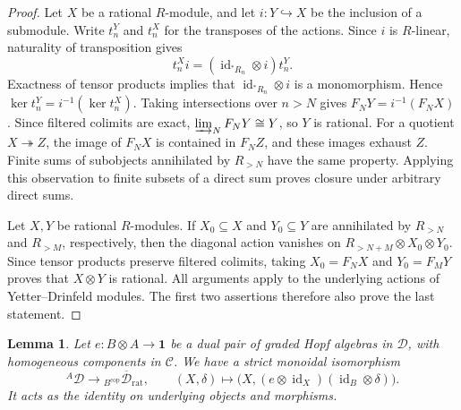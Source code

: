 \documentclass[11pt, a4paper]{article}
\numberwithin{equation}{section}
\newcommand{\C}{\mathcal C}
\newcommand{\D}{\mathcal D}
\newcommand{\one}{\mathbf 1}
\DeclareMathOperator{\id}{id}
\newcommand{\rat}{\mathrm{rat}}
\newtheorem{lemma}[theorem]{Lemma}
\begin{document}
\begin{proof}

Let $X$ be a rational $R$-module, and let
$i:Y\hookrightarrow X$ be the inclusion of a submodule.
Write $t_n^Y$ and $t_n^X$ for the transposes of the actions.
Since $i$ is $R$-linear, naturality of transposition gives
\[
 t_n^Xi=(\id_{{^*R_n}}\otimes i)t_n^Y.
\]
Exactness of tensor products implies that
$\id_{{^*R_n}}\otimes i$ is a monomorphism. Hence
$\ker t_n^Y=i^{-1}(\ker t_n^X)$.
Taking intersections over $n>N$ gives $F_NY=i^{-1}(F_NX)$.
Since filtered colimits are exact,
$\varinjlim_NF_NY\cong Y$, so $Y$ is rational.
For a quotient
$X\twoheadrightarrow Z$, the image of $F_NX$ is contained in $F_NZ$,
and these images exhaust $Z$. Finite sums of subobjects annihilated by
$R_{>N}$ have the same property. Applying this observation to finite
subsets of a direct sum proves closure under arbitrary direct sums.



Let $X,Y$ be rational $R$-modules. If $X_0\subseteq X$ and
$Y_0\subseteq Y$ are annihilated by $R_{>N}$ and $R_{>M}$,
respectively, then the diagonal action vanishes on
$R_{>N+M}\otimes X_0\otimes Y_0$.
Since tensor products preserve filtered colimits, taking
$X_0=F_NX$ and $Y_0=F_MY$ proves that $X\otimes Y$ is rational.
All arguments apply to the underlying actions of
Yetter--Drinfeld modules. The first two assertions
therefore also prove the last statement.
\end{proof}

\begin{lemma}\label{dual:transposition}
Let $e:B\otimes A\to\one$ be a dual pair of graded
Hopf algebras in $\D$, with homogeneous components in $\C$.
We have a strict monoidal isomorphism
\[
{}^A\D\longrightarrow
 {}_{B^{\mathrm{cop}}}\overline{\D}_{\rat},
 \qquad
 (X,\delta)\longmapsto
 \bigl(X,(e\otimes\id_X)(\id_B\otimes\delta)\bigr).
\]
It acts as the identity on underlying objects and morphisms.
\end{lemma}
\end{document}
